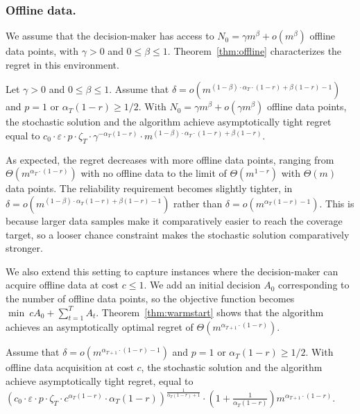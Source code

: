 \documentclass[blindrev]{informs3noheader}
\begin{document}
\subsubsection*{Offline data.}

We assume that the decision-maker has access to $N_0=\gamma m^\beta+o\left(m^\beta\right)$ offline data points, with $\gamma>0$ and $0\leq\beta\leq1$. Theorem~\ref{thm:offline} characterizes the regret in this environment.

\begin{theorem}\label{thm:offline}
Let $\gamma>0$ and $0\leq\beta\leq1$. Assume that $\delta = o\left(m^{(1-\beta)\cdot\alpha_T\cdot(1-r)+\beta(1-r)-1}\right)$ and $p=1$ or $\alpha_T(1-r)\geq1/2$. With $N_0=\gamma m^\beta+o\left(\gamma m^\beta\right)$ offline data points, the stochastic solution and the algorithm achieve asymptotically tight regret equal to $c_0 \cdot \varepsilon\cdot p\cdot\zeta_T\cdot \gamma^{-\alpha_T(1-r)}\cdot m^{(1-\beta)\cdot\alpha_T\cdot(1-r)+\beta(1-r)}$.
\end{theorem}

As expected, the regret decreases with more offline data points, ranging from $\Theta\left(m^{\alpha_T\cdot(1-r)}\right)$ with no offline data to the limit of $\Theta\left(m^{1-r}\right)$ with $\Theta(m)$ data points. The reliability requirement becomes slightly tighter, in $\delta = o(m^{(1-\beta)\cdot \alpha_T(1-r) + \beta(1-r) - 1})$ rather than $\delta = o(m^{\alpha_T(1-r) - 1})$. This is because larger data samples make it comparatively easier to reach the coverage target, so a looser chance constraint makes the stochastic solution comparatively stronger.

We also extend this setting to capture instances where the decision-maker can acquire offline data at cost $c\leq1$. We add an initial decision $A_0$ corresponding to the number of offline data points, so the objective function becomes $\min\ cA_0+\sum_{t=1}^T A_t$. Theorem~\ref{thm:warmstart} shows that the algorithm achieves an asymptotically optimal regret of $\Theta\left(m^{\alpha_{T+1}\cdot(1-r)}\right)$.

\begin{theorem}\label{thm:warmstart}
Assume that $\delta = o\left(m^{\alpha_{T+1}\cdot(1-r)-1}\right)$ and $p=1$ or $\alpha_T(1-r)\geq1/2$. With offline data acquisition at cost $c$, the stochastic solution and the algorithm achieve asymptotically tight regret, equal to $\left(c_0\cdot\varepsilon\cdot p\cdot\zeta_T\cdot c^{\alpha_T(1-r)}\cdot\alpha_T(1-r)\right)^{\frac{1}{\alpha_T(1-r)+1}}\cdot \left(1+\frac{1}{\alpha_T(1-r)}\right)m^{\alpha_{T+1}\cdot(1-r)}$.
\end{theorem}
\end{document}
